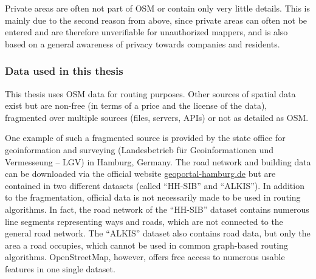 			Private areas are often not part of OSM or contain only very little details.
			This is mainly due to the second reason from above, since private areas can often not be entered and are therefore unverifiable for unauthorized mappers, and is also based on a general awareness of privacy towards companies and residents.
			
		\subsubsection{Data used in this thesis}
		
			This thesis uses OSM data for routing purposes.
			Other sources of spatial data exist but are non-free (in terms of a price and the license of the data), fragmented over multiple sources (files, servers, APIs) or not as detailed as OSM.
			
			One example of such a fragmented source is provided by the state office for geoinformation and surveying (Landesbetrieb für Geoinformationen und Vermesseung -- LGV) in Hamburg, Germany.
			The road network and building data can be downloaded via the official website \href{https://geoportal-hamburg.de}{geoportal-hamburg.de} but are contained in two different datasets (called \enquote{HH-SIB} and \enquote{ALKIS}).
			In addition to the fragmentation, official data is not necessarily made to be used in routing algorithms.
			In fact, the road network of the \enquote{HH-SIB} dataset contains numerous line segments representing ways and roads, which are not connected to the general road network.
			The \enquote{ALKIS} dataset also contains road data, but only the area a road occupies, which cannot be used in common graph-based routing algorithms.
			OpenStreetMap, however, offers free access to numerous usable features in one single dataset.
			
